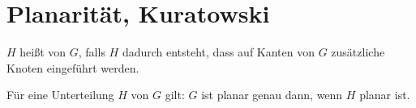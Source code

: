 \chapter{Planarität, Kuratowski}



\begin{df}
    $H$ heißt  von $G$, falls $H$ dadurch entsteht, dass auf Kanten von $G$ zusätzliche Knoten eingeführt werden.
\end{df}

\begin{note}
    Für eine Unterteilung $H$ von $G$ gilt:
    $G$ ist planar genau dann, wenn $H$ planar ist.
\end{note}

